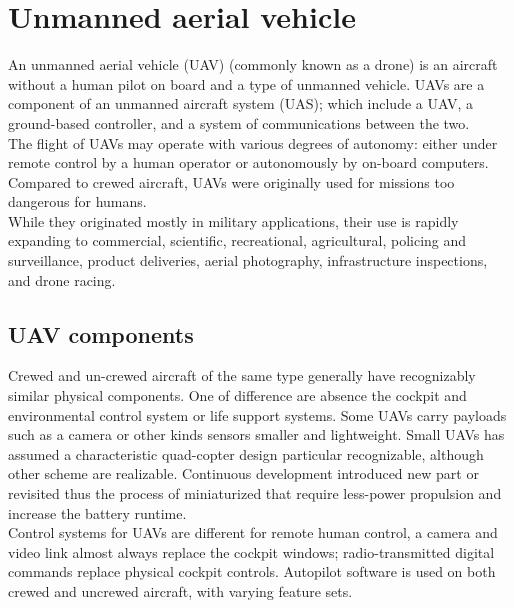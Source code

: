 \section{Unmanned aerial vehicle}
\label{sec:unmanned-aerial-vehicle}
%
%
An unmanned aerial vehicle (UAV) (commonly known as a drone) is an aircraft 
without a human pilot on board and a type of unmanned vehicle. 
UAVs are a component of an unmanned aircraft system (UAS); which include a UAV,
a ground-based controller, and a system of communications between the two.\\  
The flight of UAVs may operate with various degrees of autonomy: either under
remote control by a human operator or autonomously by on-board computers.
Compared to crewed aircraft, UAVs were originally used for missions too
dangerous for humans.\cite{budiansky2005air}\\
While they originated mostly in military applications, their use is rapidly
expanding to commercial, scientific, recreational, agricultural, policing and
surveillance, product deliveries, aerial photography, infrastructure
inspections, and drone racing.\cite{wiki:uav}
%
%
\subsection{UAV components}
\label{ssec:components}
%
Crewed and un-crewed aircraft of the same type generally have recognizably
similar physical components.  One of difference are absence the cockpit and
environmental control system or life support systems.  
Some UAVs carry payloads such as a camera or other kinds sensors smaller and 
lightweight.
Small UAVs has assumed a characteristic quad-copter design particular
recognizable, although other scheme are realizable. 
Continuous development introduced new part or revisited thus the process of
miniaturized that require less-power propulsion and increase the battery
runtime.\\
Control systems for UAVs are different for remote human control, a camera
and video link almost always replace the cockpit windows; radio-transmitted
digital commands replace physical cockpit controls. Autopilot software is used
on both crewed and uncrewed aircraft, with varying feature sets.\cite{wiki:uav}
%
%
\begin{figure}[htb]
    \centering
     \\
     \\
    \label{fig:uav-design}
\end{figure}
%
%
